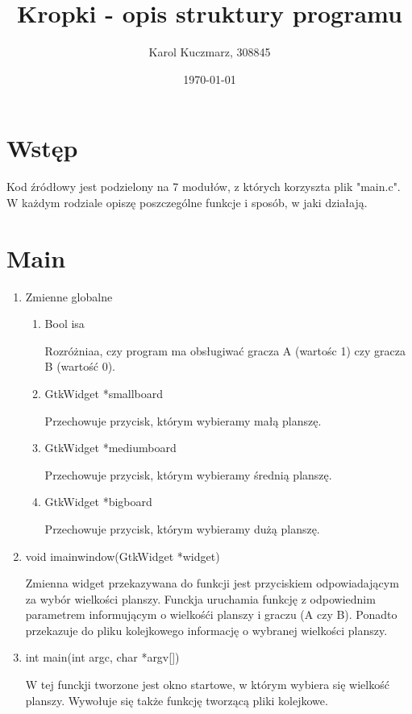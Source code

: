 \documentclass{article}
\author{Karol Kuczmarz, 308845}
\title{Kropki - opis struktury programu}
\date{\today}
\begin{document}
\maketitle

\tableofcontents{}
\newpage

\section{Wstęp}

Kod źródłowy jest podzielony na 7 modułów, z których korzyszta plik "main.c". W każdym rodziale opiszę poszczególne funkcje i sposób, w jaki działają.

\section{Main}

\begin{enumerate}
\item Zmienne globalne

\begin{enumerate}

\item \textunderscore Bool isa

Rozróżniaa, czy program ma obsługiwać gracza A (wartośc 1) czy gracza B (wartość 0).

\item GtkWidget *small\textunderscore board

Przechowuje przycisk, którym wybieramy małą planszę.

\item GtkWidget *medium\textunderscore board

Przechowuje przycisk, którym wybieramy średnią planszę.

\item GtkWidget *big\textunderscore board

Przechowuje przycisk, którym wybieramy dużą planszę.

\end{enumerate}

\item void i\textunderscore main\textunderscore window(GtkWidget *widget)

Zmienna widget przekazywana do funkcji jest przyciskiem odpowiadającym za wybór wielkości planszy. Funckja uruchamia funkcję  z odpowiednim parametrem informującym o wielkośći planszy i graczu (A czy B). Ponadto przekazuje do pliku kolejkowego informację o wybranej wielkości planszy.

\item int main(int argc, char *argv[])

W tej funckji tworzone jest okno startowe, w którym wybiera się wielkość planszy. Wywołuje się także funkcję tworzącą pliki kolejkowe.

\end{enumerate}
\end{document}
